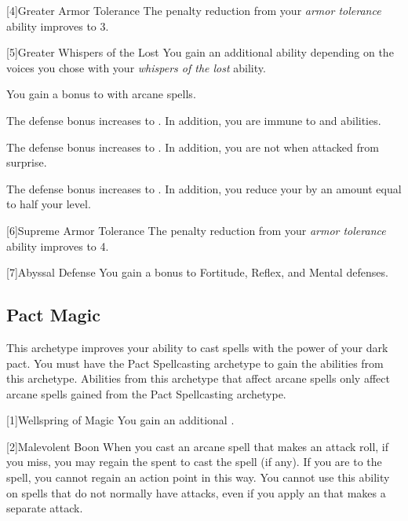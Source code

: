        [4]{Greater Armor Tolerance} The penalty reduction from your \textit{armor tolerance} ability improves to 3.

        [5]{Greater Whispers of the Lost} You gain an additional ability depending on the voices you chose with your \textit{whispers of the lost} ability.
        {
             You gain a  bonus to  with arcane spells.

             The defense bonus increases to .
            In addition, you are immune to  and  abilities.

             The defense bonus increases to .
            In addition, you are not  when attacked from surprise.

             The defense bonus increases to .
            In addition, you reduce your  by an amount equal to half your level.
        }

        [6]{Supreme Armor Tolerance} The penalty reduction from your \textit{armor tolerance} ability improves to 4.

        [7]{Abyssal Defense} You gain a  bonus to Fortitude, Reflex, and Mental defenses.

    \subsection{Pact Magic}
        This archetype improves your ability to cast spells with the power of your dark pact.
        You must have the Pact Spellcasting archetype to gain the abilities from this archetype.
        Abilities from this archetype that affect arcane spells only affect arcane spells gained from the Pact Spellcasting archetype.

        [1]{Wellspring of Magic} You gain an additional .

        [2]{Malevolent Boon}
        When you cast an arcane spell that makes an attack roll, if you miss, you may regain the  spent to cast the spell (if any).
        If you are  to the spell, you cannot regain an action point in this way.
        You cannot use this ability on spells that do not normally have attacks, even if you apply an  that makes a separate attack.

